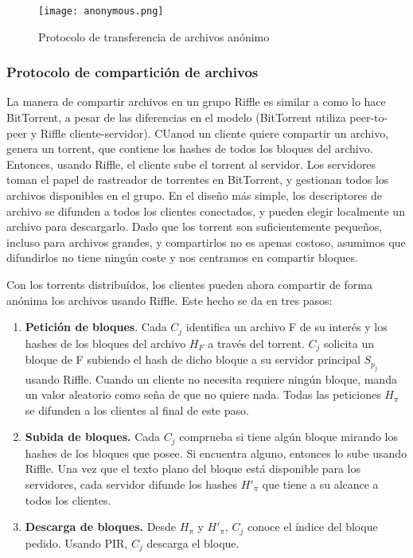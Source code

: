 \begin{figure}[h]
	\texttt{[image: anonymous.png]}
	\caption{Protocolo de transferencia de archivos anónimo}
\end{figure}

\subsubsection{Protocolo de compartición de archivos}

La manera de compartir archivos en un grupo Riffle es similar a como lo hace BitTorrent, a pesar de las diferencias en el modelo (BitTorrent utiliza peer-to-peer y Riffle cliente-servidor). CUanod un cliente quiere compartir un archivo, genera un torrent, que contiene los hashes de todos los bloques del archivo. Entonces, usando Riffle, el cliente sube el torrent al servidor. Los servidores toman el papel de rastreador de torrentes en BitTorrent, y gestionan todos los archivos disponibles en el grupo. En el diseño más simple, los descriptores de archivo se difunden a todos los clientes conectados, y pueden elegir localmente un archivo para descargarlo. Dado que los torrent son suficientemente pequeños, incluso para archivos grandes, y compartirlos no es apenas costoso, asumimos que difundirlos no tiene ningún coste y nos centramos en compartir bloques. 

Con los torrents distribuídos, los clientes pueden ahora compartir de forma anónima los archivos usando Riffle. Este hecho se da en tres pasos:
\begin{enumerate}
	\item \textbf{Petición de bloques}. Cada $C_j$ identifica un archivo F de su interés y los hashes de los bloques del archivo $H_F$ a través del torrent. $C_j$ solicita un bloque de F subiendo el hash de dicho bloque a su servidor principal $S_{p_j}$ usando Riffle. Cuando un cliente no necesita requiere ningún bloque, manda un valor aleatorio como seña de que no quiere nada. Todas las peticiones $H_\pi$ se difunden a los clientes al final de este paso.
	\item \textbf{Subida de bloques.} Cada $C_j$ comprueba si tiene algún bloque mirando los hashes de los bloques que posee. Si encuentra alguno, entonces lo sube usando Riffle. Una vez que el texto plano del bloque está disponible para los servidores, cada servidor difunde los hashes $H'_\pi$ que tiene a su alcance a todos los clientes.
	\item \textbf{Descarga de bloques.} Desde $H_\pi$ y $H'_\pi$, $C_j$ conoce el índice del bloque pedido. Usando PIR, $C_j$ descarga el bloque. 
\end{enumerate}	

